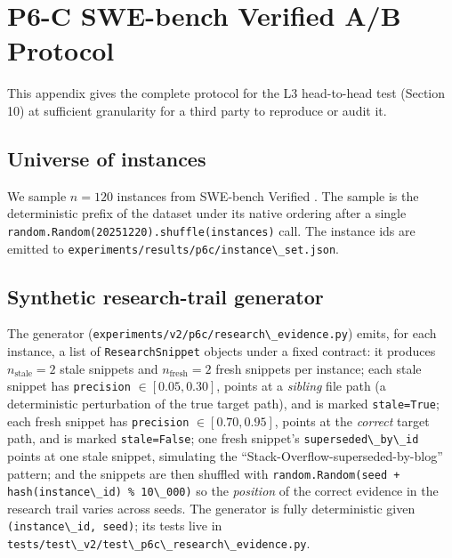\section{P6-C SWE-bench Verified A/B Protocol}\label{p6-c-swe-bench-verified-ab-protocol}

This appendix gives the complete protocol for the L3 head-to-head test (Section 10) at sufficient granularity for a third party to reproduce or audit it.

\subsection{Universe of instances}\label{universe-of-instances}

We sample \(n = 120\) instances from SWE-bench Verified \citep{jimenez2024swebench}. The sample is the deterministic prefix of the dataset under its native ordering after a single \passthrough{\lstinline!random.Random(20251220).shuffle(instances)!} call. The instance ids are emitted to \passthrough{\lstinline!experiments/results/p6c/instance\_set.json!}.

\subsection{Synthetic research-trail generator}\label{synthetic-research-trail-generator}

The generator (\passthrough{\lstinline!experiments/v2/p6c/research\_evidence.py!}) emits, for each instance, a list of \passthrough{\lstinline!ResearchSnippet!} objects under a fixed contract: it produces \(n_{\text{stale}} = 2\) stale snippets and \(n_{\text{fresh}} = 2\) fresh snippets per instance; each stale snippet has \passthrough{\lstinline!precision!} \(\in [0.05, 0.30]\), points at a \emph{sibling} file path (a deterministic perturbation of the true target path), and is marked \passthrough{\lstinline!stale=True!}; each fresh snippet has \passthrough{\lstinline!precision!} \(\in [0.70, 0.95]\), points at the \emph{correct} target path, and is marked \passthrough{\lstinline!stale=False!}; one fresh snippet's \passthrough{\lstinline!superseded\_by\_id!} points at one stale snippet, simulating the ``Stack-Overflow-superseded-by-blog'' pattern; and the snippets are then shuffled with \passthrough{\lstinline!random.Random(seed + hash(instance\_id) \% 10\_000)!} so the \emph{position} of the correct evidence in the research trail varies across seeds. The generator is fully deterministic given \passthrough{\lstinline!(instance\_id, seed)!}; its tests live in \passthrough{\lstinline!tests/test\_v2/test\_p6c\_research\_evidence.py!}.

